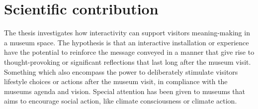 \section{Scientific contribution}
The thesis investigates how interactivity can support visitors meaning-making in a museum space. The hypothesis is that an interactive installation or experience have the potential to reinforce the message conveyed in a manner that give rise to thought-provoking or significant reflections that last long after the museum visit. Something which also encompass the power to deliberately stimulate visitors lifestyle choices or actions after the museum visit, in compliance with the museums agenda and vision. Special attention has been given to museums that aims to encourage social action, like climate consciousness or climate action.